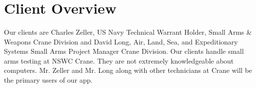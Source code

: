 \section{Client Overview}
\paragraph{} Our clients are Charles Zeller, US Navy Technical Warrant Holder, Small Arms \& Weapons Crane Division and David Long, Air, Land, Sea, and Expeditionary Systems Small Arms Project Manager Crane Division. Our clients handle small arms testing at NSWC Crane. They are not extremely knowledgeable about computers. Mr. Zeller and Mr. Long along with other technicians at Crane will be the primary users of our app.